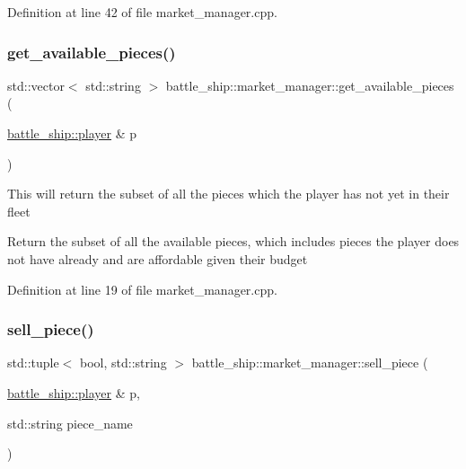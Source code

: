Definition at line 42 of file market\+\_\+manager.\+cpp.

\mbox{\label{classbattle__ship_1_1market__manager_a7f0c8f8ddbf6f2e49b9004ea1f05bfe7}} 
\subsubsection{\texorpdfstring{get\+\_\+available\+\_\+pieces()}{get\_available\_pieces()}}
{\footnotesize\ttfamily std\+::vector$<$ std\+::string $>$ battle\+\_\+ship\+::market\+\_\+manager\+::get\+\_\+available\+\_\+pieces (\begin{DoxyParamCaption}\item[{\hyperlink{classbattle__ship_1_1player}{battle\+\_\+ship\+::player} \&}]{p }\end{DoxyParamCaption})\hspace{0.3cm}{\ttfamily [static]}}

This will return the subset of all the pieces which the player has not yet in their fleet

Return the subset of all the available pieces, which includes pieces the player does not have already and are affordable given their budget 

Definition at line 19 of file market\+\_\+manager.\+cpp.

\mbox{\label{classbattle__ship_1_1market__manager_abfdff8ba2f4098656d9c53140c34876c}} 
\subsubsection{\texorpdfstring{sell\+\_\+piece()}{sell\_piece()}}
{\footnotesize\ttfamily std\+::tuple$<$ bool, std\+::string $>$ battle\+\_\+ship\+::market\+\_\+manager\+::sell\+\_\+piece (\begin{DoxyParamCaption}\item[{\hyperlink{classbattle__ship_1_1player}{battle\+\_\+ship\+::player} \&}]{p,  }\item[{std\+::string}]{piece\+\_\+name }\end{DoxyParamCaption})\hspace{0.3cm}{\ttfamily [static]}}



